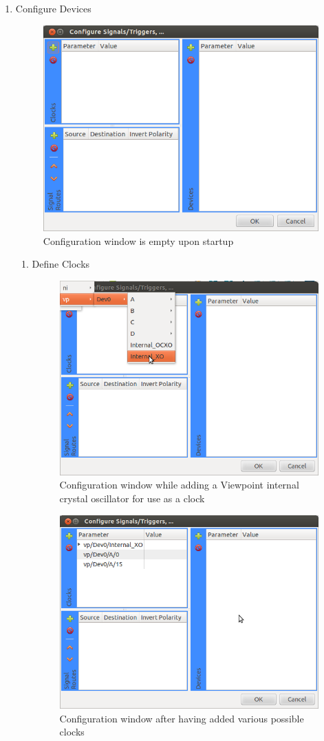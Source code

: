 \begin{enumerate}
  \item Configure Devices

    \begin{figure}[ht]
      \centerline{\includegraphics[width=.5\textwidth]{figures/configure-empty}}
      \caption{Configuration window is empty upon startup}
      \label{fig:quick:configure-empty}
    \end{figure}

    \begin{enumerate}
      \item Define Clocks

      \begin{figure}[ht]
        \centerline{\includegraphics[width=.5\textwidth]{figures/configure-add-clock-vp-XO}}
        \caption{Configuration window while adding a Viewpoint internal crystal
        oscillator for use as a clock}
        \label{fig:quick:configure-add-clock-vp-XO}
      \end{figure}

      \begin{figure}[ht]
        \centerline{\includegraphics[width=.5\textwidth]{figures/configure-clocks-added}}
        \caption{Configuration window after having added various possible clocks}
        \label{fig:quick:configure-clocks-added}
      \end{figure}


\end{enumerate}
\end{enumerate}
